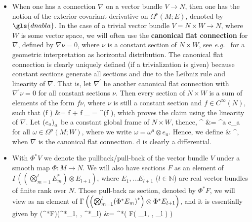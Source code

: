 \begin{itemize}
	\item When one has a connection $\nabla$ on a vector bundle $V \to N$, then one has the notion of the exterior covariant derivative on $\Omega^p(M;E)$, denoted by $\gls{dnabla}$. In the case of a trivial vector bundle $V=N \times W \to N$, where $W$ is some vector space, we will often use the \textbf{canonical flat connection} for $\nabla$, defined by $\nabla \nu = 0$, where $\nu$ is a constant section of $N \times W$, see \textit{e.g.}~\cite[Example 5.1.7; page 260f.]{hamilton} for a geometric interpretation as horizontal distribution. The canonical flat connection is clearly uniquely defined (if a trivialization is given) because constant sections generate all sections and due to the Leibniz rule and linearity of $\nabla$. That is, let $\nabla^\prime$ be another canonical flat connection with $\nabla^\prime \nu = 0$ for all constant sections $\nu$. Then every section of $N \times W$ is a sum of elements of the form $f \nu$, where $\nu$ is still a constant section and $f \in C^\infty(N)$, such that
\bas
\nabla(f \nu)
&=
f \otimes \nu
	+ f \underbrace{\nabla \nu}_{}
=
\nabla^\prime(f \nu),
\eas
which proves the claim using the linearity of $\nabla$. Let $\mleft( e_a \mright)_a$ be a constant global frame of $N \times W$, thence,
\bas
{}^\nabla \omega
&=
 \omega^a \otimes e_a
\eas
for all $\omega \in \Omega^p(M; W)$, where we write $\omega= \omega^a \otimes e_a$. Hence, we define
\ba
{}\omega
&\coloneqq
{}^\nabla \omega,
\ea
when $\nabla$ is the canonical flat connection. $\mathrm{d}$ is clearly a differential.
	\item With $\Phi^*V$ we denote the pullback/pull-back of the vector bundle $V$ under a smooth map $\Phi: M \to N$. We will also have sections $F$ as an element of $\Gamma\left( \left(\bigotimes_{m=1}^{l} E_m^*\right) \otimes E_{l+1} \right)$, where $E_1, \dots E_{l+1}$ ($l \in \mathbb{N}$) are real vector bundles of finite rank over $N$. Those pull-back as section, denoted by $\Phi^*F$, we will view as an element of $\Gamma\left( \mleft(\bigotimes_{m=1}^{l} \mleft(\Phi^*E_m\mright)^*\mright) \otimes \Phi^*E_{l+1} \right)$, and it is essentially given by
\bas
	(\Phi^*F)(\Phi^*\nu_1, \dotsc , \Phi^*\nu_l)
	&=
	\Phi^*\mleft( F\mleft( \nu_1, \dotsc, \nu_l \mright) \mright)
\eas

\end{itemize}
